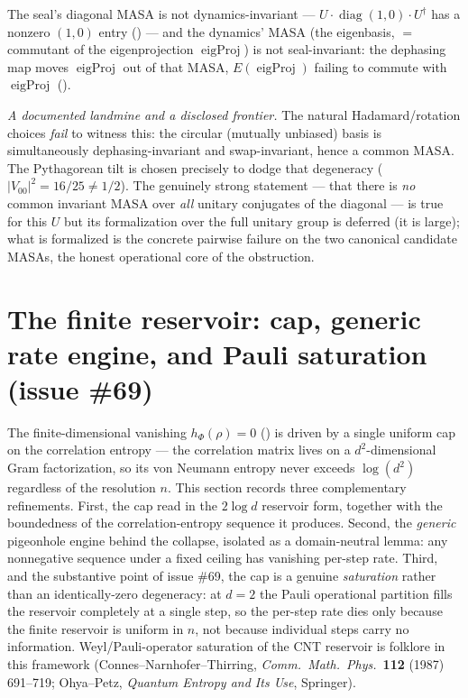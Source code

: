 \begin{theorem}\label{qDynamics_seal_no_common_canonical_masa}
  \leanok
  The seal's diagonal MASA is not dynamics-invariant --- \(U\cdot\operatorname{diag}(1,0)\cdot U^\dagger\)
  has a nonzero \((1,0)\) entry ()
  --- and the dynamics' MASA (the eigenbasis, \(=\) commutant of the eigenprojection
  \(\operatorname{eigProj}\)) is not seal-invariant: the dephasing map moves \(\operatorname{eigProj}\)
  out of that MASA, \(E(\operatorname{eigProj})\) failing to commute with \(\operatorname{eigProj}\)
  ().
\end{theorem}

\emph{A documented landmine and a disclosed frontier.} The natural Hadamard/rotation choices
\emph{fail} to witness this: the circular (mutually unbiased) basis is simultaneously
dephasing-invariant and swap-invariant, hence a common MASA. The Pythagorean tilt is chosen precisely
to dodge that degeneracy (\(|V_{00}|^2 = 16/25\ne 1/2\)). The genuinely strong statement --- that
there is \emph{no} common invariant MASA over \emph{all} unitary conjugates of the diagonal --- is
true for this \(U\) but its formalization over the full unitary group is deferred (it is large); what
is formalized is the concrete pairwise failure on the two canonical candidate MASAs, the honest
operational core of the obstruction.

\section{The finite reservoir: cap, generic rate engine, and Pauli saturation (issue \#69)}
\label{sec:reservoir-saturation}

The finite-dimensional vanishing \(h_\Phi(\rho) = 0\) () is driven
by a single uniform cap on the correlation entropy --- the correlation matrix lives on a
\(d^{2}\)-dimensional Gram factorization, so its von Neumann entropy never exceeds \(\log(d^{2})\)
regardless of the resolution \(n\). This section records three complementary refinements. First, the
cap read in the \(2\log d\) reservoir form, together with the boundedness of the correlation-entropy
sequence it produces. Second, the \emph{generic} pigeonhole engine behind the collapse, isolated as a
domain-neutral lemma: any nonnegative sequence under a fixed ceiling has vanishing per-step rate.
Third, and the substantive point of issue \#69, the cap is a genuine \emph{saturation} rather than an
identically-zero degeneracy: at \(d = 2\) the Pauli operational partition fills the reservoir
completely at a single step, so the per-step rate dies only because the finite reservoir is uniform
in \(n\), not because individual steps carry no information. Weyl/Pauli-operator saturation of the CNT
reservoir is folklore in this framework (Connes--Narnhofer--Thirring, \emph{Comm.\ Math.\ Phys.}\
\textbf{112} (1987) 691--719; Ohya--Petz, \emph{Quantum Entropy and Its Use}, Springer).

